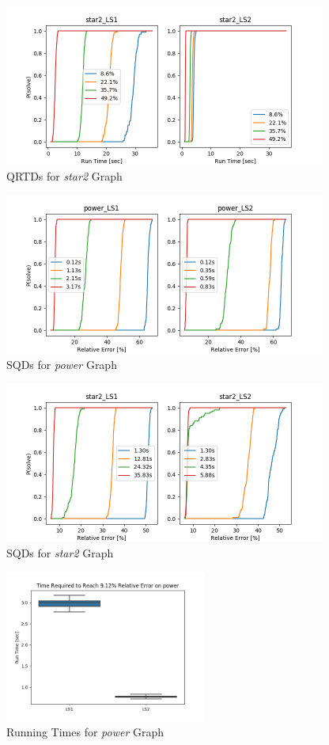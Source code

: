 \documentclass[sigconf]{acmart}
\begin{document}
\begin{figure}[h]
	\centering
	\includegraphics[width=400px]{plots/qrtd_star2.png}
	\caption{QRTDs for \textit{star2} Graph}
	\label{figure:qrtd_star2}
\end{figure}

\begin{figure}[h]
	\centering
	\includegraphics[width=400px]{plots/sqd_power.png}
	\caption{SQDs for \textit{power} Graph}
	\label{figure:sqd_power}
\end{figure}

\begin{figure}[h]
	\centering
	\includegraphics[width=400px]{plots/sqd_star2.png}
	\caption{SQDs for \textit{star2} Graph}
	\label{figure:sqd_star2}
\end{figure}

\begin{figure}[h]
	\centering
	\includegraphics[width=250px]{plots/boxplot_power.png}
	\caption{Running Times for \textit{power} Graph}
	\label{figure:boxplot_power}
\end{figure}
\end{document}
